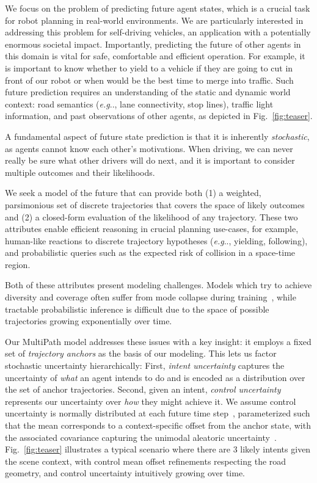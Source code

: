 \documentclass{article}
\makeatletter
\DeclareRobustCommand\onedot{\futurelet\@let@token\@onedot}
\def\@onedot{\ifx\@let@token.\else.\null\fi\xspace}
\def\eg{\emph{e.g}\onedot} \def\Eg{\emph{E.g}\onedot}
\makeatother
\begin{document}
We focus on the problem of predicting future agent states, which is a crucial task for robot planning in real-world environments.  We are particularly interested in addressing this problem for self-driving vehicles, an application with a potentially enormous societal impact. Importantly, predicting the future of other agents in this domain is vital for safe, comfortable and efficient operation.  For example, it is important to know whether to yield to a vehicle if they are going to cut in front of our robot or when would be the best time to merge into traffic. Such future prediction requires an understanding of the static and dynamic world context: road semantics (\eg, lane connectivity, stop lines), traffic light information, and past observations of other agents, as depicted in Fig.~\ref{fig:teaser}.

A fundamental aspect of future state prediction is that it is inherently {\em stochastic}, as agents cannot know each other's motivations.  When driving, we can never really be sure what other drivers will do next, and it is important to consider multiple outcomes and their likelihoods.  

We seek a model of the future that can provide both (1) a weighted, parsimonious set of discrete trajectories that covers the space of likely outcomes and (2) a closed-form evaluation of the likelihood of any trajectory.  These two attributes enable efficient reasoning in crucial planning use-cases, for example, human-like reactions to discrete trajectory hypotheses (\eg, yielding, following), and probabilistic queries such as the expected risk of collision in a space-time region.

Both of these attributes present modeling challenges.  Models which try to achieve diversity and coverage often suffer from mode collapse during training~\cite{Rhinehart18, Bishop06, Hong19}, while tractable probabilistic inference is difficult due to the space of possible trajectories growing exponentially over time.

Our MultiPath model addresses these issues with a key insight: it employs a fixed set of {\em trajectory anchors} as the basis of our modeling. This lets us factor stochastic uncertainty hierarchically: First, {\em intent uncertainty} captures the uncertainty of {\em what} an agent intends to do and is encoded as a distribution over the set of anchor trajectories. Second, given an intent, {\em control uncertainty} represents our uncertainty over {\em how} they might achieve it. We assume control uncertainty is normally distributed at each future time step~\cite{Thrun05}, parameterized such that the mean corresponds to a context-specific offset from the anchor state, with the associated covariance capturing the unimodal aleatoric uncertainty~\cite{Kendall17}.  Fig.~\ref{fig:teaser} illustrates a typical scenario where there are 3 likely intents given the scene context, with control mean offset refinements respecting the road geometry, and control uncertainty intuitively growing over time.
\end{document}
